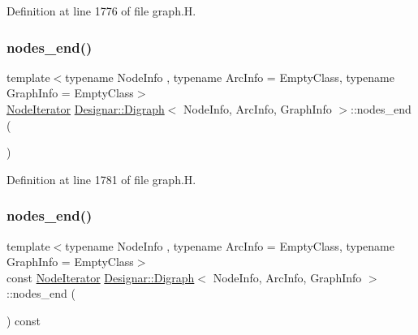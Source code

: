 Definition at line 1776 of file graph.\+H.

\mbox{\label{class_designar_1_1_digraph_a67917506d721e541955aa2a639b94759}} 
\subsubsection{\texorpdfstring{nodes\+\_\+end()}{nodes\_end()}\hspace{0.1cm}{\footnotesize\ttfamily [1/2]}}
{\footnotesize\ttfamily template$<$typename Node\+Info , typename Arc\+Info  = Empty\+Class, typename Graph\+Info  = Empty\+Class$>$ \\
\hyperlink{class_designar_1_1_digraph_1_1_node_iterator}{Node\+Iterator} \hyperlink{class_designar_1_1_digraph}{Designar\+::\+Digraph}$<$ Node\+Info, Arc\+Info, Graph\+Info $>$\+::nodes\+\_\+end (\begin{DoxyParamCaption}{ }\end{DoxyParamCaption})\hspace{0.3cm}{\ttfamily [inline]}}



Definition at line 1781 of file graph.\+H.

\mbox{\label{class_designar_1_1_digraph_a82c01284de2fc81c7bd04c13d8861d9a}} 
\subsubsection{\texorpdfstring{nodes\+\_\+end()}{nodes\_end()}\hspace{0.1cm}{\footnotesize\ttfamily [2/2]}}
{\footnotesize\ttfamily template$<$typename Node\+Info , typename Arc\+Info  = Empty\+Class, typename Graph\+Info  = Empty\+Class$>$ \\
const \hyperlink{class_designar_1_1_digraph_1_1_node_iterator}{Node\+Iterator} \hyperlink{class_designar_1_1_digraph}{Designar\+::\+Digraph}$<$ Node\+Info, Arc\+Info, Graph\+Info $>$\+::nodes\+\_\+end (\begin{DoxyParamCaption}{ }\end{DoxyParamCaption}) const\hspace{0.3cm}{\ttfamily [inline]}}



